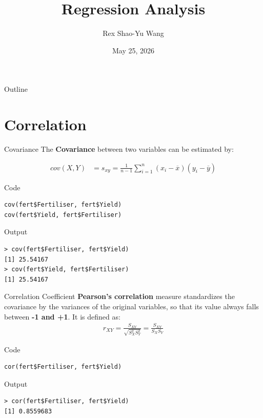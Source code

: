 \documentclass[aspectratio=169]{beamer}
\title{Regression Analysis}
\author{Rex Shao-Yu Wang}
\institute{Department of Agronomy, National Taiwan University}
\date{May 25, 2026}
\begin{document}
\begin{frame}
  \titlepage
\end{frame}

\begin{frame}{Outline}
  \tableofcontents
\end{frame}


\section{Correlation}

\begin{frame}[fragile]{Covariance}
The \textbf{Covariance} between two variables can be estimated by:

\begin{align*}
    cov(X,Y) &= s_{xy} = \frac{1}{n-1}\sum_{i=1}^n (x_i - \overline{x})(y_i - \overline{y}) 
\end{align*} 

\begin{block}{Code}
\begin{lstlisting}
cov(fert$Fertiliser, fert$Yield)
cov(fert$Yield, fert$Fertiliser)
\end{lstlisting}
\end{block}

\begin{exampleblock}{Output}
\begin{lstlisting}[numbers=none]
> cov(fert$Fertiliser, fert$Yield)
[1] 25.54167
> cov(fert$Yield, fert$Fertiliser)
[1] 25.54167
\end{lstlisting}
\end{exampleblock}

\end{frame}


\begin{frame}[fragile]{Correlation Coefficient}
\textbf{Pearson’s correlation} measure standardizes the covariance by the variances of the original variables, so that its value always falls between \textbf{-1 and +1}.
It is defined as:
{\large
\begin{align*}
	r_{XY} = \frac{S_{XY}}{\sqrt{S^2_X S^2_Y}} = \frac{S_{XY}}{S_XS_Y}
\end{align*}}

\begin{block}{Code}
\begin{lstlisting}
cor(fert$Fertiliser, fert$Yield)
\end{lstlisting}
\end{block}

\begin{exampleblock}{Output}
\begin{lstlisting}[numbers=none]
> cor(fert$Fertiliser, fert$Yield)
[1] 0.8559683
\end{lstlisting}
\end{exampleblock}
\end{frame}
\end{document}
